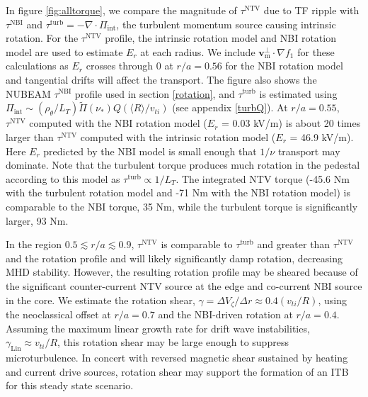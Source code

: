 \documentclass[aip, pop, preprint]{revtex4-1}
\numberwithin{figure}{section}
\numberwithin{equation}{section}
\begin{document}
In figure \ref{fig:alltorque}, we compare the magnitude of $\tau^{\mathrm{NTV}}$ due to TF ripple with $\tau^{\mathrm{NBI}}$ and $\tau^{\mathrm{turb}} = -\nabla \cdot \Pi_{\mathrm{int}}$, the turbulent momentum source causing intrinsic rotation. For the $\tau^{\mathrm{NTV}}$ profile, the intrinsic rotation model and NBI rotation model are used to estimate $E_r$ at each radius. We include $\bm{v}_{\text{m}}^{\perp} \cdot \nabla f_1$ for these calculations as $E_r$ crosses through 0 at $r/a = 0.56$ for the NBI rotation model and tangential drifts will affect the transport. The figure also shows the NUBEAM $\tau^{\mathrm{NBI}}$ profile used in section \ref{rotation}, and $\tau^{\mathrm{turb}}$ is estimated using $\Pi_{\mathrm{int}} \sim (\rho_{\theta}/L_T) \widetilde{\Pi}(\nu_*) Q (\langle R \rangle/v_{ti})$ (see appendix \ref{turbQ}). At $r/a = 0.55$, $\tau^{\mathrm{NTV}}$ computed with the NBI rotation model ($E_r$ = 0.03 kV/m) is about 20 times larger than $\tau^{\mathrm{NTV}}$ computed with the intrinsic rotation model ($E_r$ = 46.9 kV/m). Here $E_r$ predicted by the NBI model is small enough that $1/\nu$ transport may dominate. Note that the turbulent torque produces much rotation in the pedestal according to this model as $\tau^{\mathrm{turb}} \propto 1/L_T$. The integrated NTV torque (-45.6 Nm with the turbulent rotation model and -71 Nm with the NBI rotation model) is comparable to the NBI torque, 35 Nm, while the turbulent torque is significantly larger, 93 Nm. 

In the region $0.5 \lesssim r/a \lesssim 0.9$, $\tau^{\mathrm{NTV}}$ is comparable to $\tau^{\mathrm{turb}}$ and greater than $\tau^{\mathrm{NTV}}$ and the rotation profile and will likely significantly damp rotation, decreasing MHD stability. However, the resulting rotation profile may be sheared because of the significant counter-current NTV source at the edge and co-current NBI source in the core. We estimate the rotation shear, $\gamma = \Delta V_{\zeta}/ \Delta r \approx 0.4 (v_{ti}/R)$, using the neoclassical offset at $r/a = 0.7$ and the NBI-driven rotation at $r/a = 0.4$. Assuming the maximum linear growth rate for drift wave instabilities, $\gamma_{\mathrm{Lin}} \approx v_{ti}/R$,\cite{Connor2004} this rotation shear may be large enough to suppress microturbulence. In concert with reversed magnetic shear sustained by heating and current drive sources,\cite{Poli2014} rotation shear may support the formation of an ITB \cite{Waltz1994} for this steady state scenario. 
\end{document}
